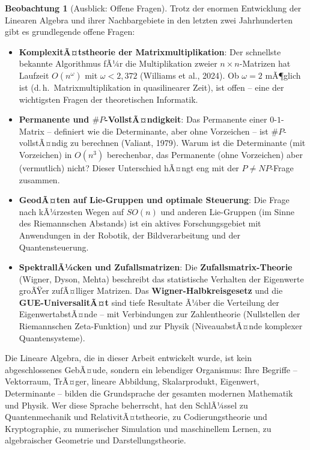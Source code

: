 ﻿\documentclass[a4paper,12pt]{report}
\theoremstyle{definition}
\newtheorem{beobachtung}{Beobachtung}
\begin{document}
\begin{beobachtung}[Ausblick: Offene Fragen]
    Trotz der enormen Entwicklung der Linearen Algebra und ihrer
    Nachbargebiete in den letzten zwei Jahrhunderten gibt es
    grundlegende offene Fragen:
    \begin{itemize}
        \item[-] \textbf{KomplexitÃ¤tstheorie der Matrixmultiplikation}:
              Der schnellste bekannte Algorithmus fÃ¼r die
              Multiplikation zweier $n \times n$-Matrizen hat
              Laufzeit $O(n^\omega)$ mit $\omega < 2{,}372$ (Williams et al., 2024).
              Ob $\omega = 2$ mÃ¶glich ist (d.\,h.\ Matrixmultiplikation
              in quasilinearer Zeit), ist offen -- eine der wichtigsten
              Fragen der theoretischen Informatik.
        \item[-] \textbf{Permanente und $\#P$-Voll\-stÃ¤n\-dig\-keit}:
              Das Permanente einer $0$-$1$-Matrix -- definiert wie
              die Determinante, aber ohne Vorzeichen --
              ist $\#P$-vollstÃ¤ndig zu berechnen (Valiant, 1979).
              Warum ist die Determinante (mit Vorzeichen) in $O(n^3)$
              berechenbar, das Permanente (ohne Vorzeichen) aber
              (vermutlich) nicht? Dieser Unterschied hÃ¤ngt eng mit
              der $P \neq NP$-Frage zusammen.
        \item[-] \textbf{GeodÃ¤ten auf Lie-Gruppen und optimale
              Steuerung}: Die Frage nach kÃ¼rzesten Wegen auf $SO(n)$
              und anderen Lie-Gruppen (im Sinne des Riemannschen
              Abstands) ist ein aktives Forschungsgebiet mit
              Anwendungen in der Robotik, der Bildverarbeitung
              und der Quantensteuerung.
        \item[-] \textbf{SpektrallÃ¼cken und Zufallsmatrizen}:
              Die \textbf{Zufallsmatrix-Theorie} (Wigner, Dyson,
              Mehta) beschreibt das statistische Verhalten der
              Eigenwerte groÃŸer zufÃ¤lliger Matrizen. Das
              \textbf{Wigner-Halbkreisgesetz} und die
              \textbf{GUE-UniversalitÃ¤t} sind tiefe Resultate
              Ã¼ber die Verteilung der EigenwertabstÃ¤nde --
              mit Verbindungen zur Zahlentheorie (Nullstellen
              der Riemannschen Zeta-Funktion) und zur Physik
              (NiveauabstÃ¤nde komplexer Quantensysteme).
    \end{itemize}
\end{beobachtung}

Die Lineare Algebra, die in dieser Arbeit entwickelt wurde, ist
kein abgeschlossenes GebÃ¤ude, sondern ein lebendiger Organismus:
Ihre Begriffe -- Vektorraum, TrÃ¤ger, lineare Abbildung,
Skalarprodukt, Eigenwert, Determinante -- bilden die Grundsprache
der gesamten modernen Mathematik und Physik. Wer diese Sprache
beherrscht, hat den SchlÃ¼ssel zu Quantenmechanik und
RelativitÃ¤tstheorie, zu Codierungstheorie und Kryptographie,
zu numerischer Simulation und maschinellem Lernen,
zu algebraischer Geometrie und Darstellungstheorie.
\end{document}
